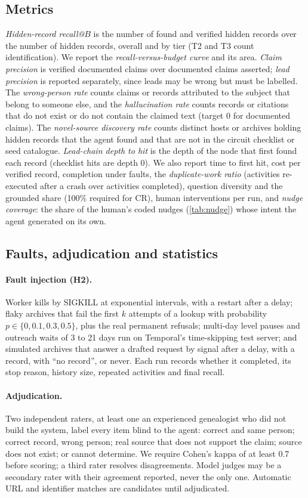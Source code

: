 \subsection{Metrics}
\emph{Hidden-record recall@$B$} is the number of found and verified hidden records over the number of hidden records, overall and by tier (T2 and T3 count identification). We report the \emph{recall-versus-budget curve} and its area. \emph{Claim precision} is verified documented claims over documented claims asserted; \emph{lead precision} is reported separately, since leads may be wrong but must be labelled. The \emph{wrong-person rate} counts claims or records attributed to the subject that belong to someone else, and the \emph{hallucination rate} counts records or citations that do not exist or do not contain the claimed text (target 0 for documented claims). The \emph{novel-source discovery rate} counts distinct hosts or archives holding hidden records that the agent found and that are not in the circuit checklist or seed catalogue. \emph{Lead-chain depth to hit} is the depth of the node that first found each record (checklist hits are depth 0). We also report time to first hit, cost per verified record, completion under faults, the \emph{duplicate-work ratio} (activities re-executed after a crash over activities completed), question diversity and the grounded share (100\% required for CR), human interventions per run, and \emph{nudge coverage}: the share of the human's coded nudges (\cref{tab:nudge}) whose intent the agent generated on its own.

\subsection{Faults, adjudication and statistics}
\paragraph{Fault injection (H2).} Worker kills by SIGKILL at exponential intervals, with a restart after a delay; flaky archives that fail the first $k$ attempts of a lookup with probability $p\in\{0,0.1,0.3,0.5\}$, plus the real permanent refusals; multi-day level pauses and outreach waits of 3 to 21 days run on Temporal's time-skipping test server; and simulated archives that answer a drafted request by signal after a delay, with a record, with ``no record'', or never. Each run records whether it completed, its stop reason, history size, repeated activities and final recall.

\paragraph{Adjudication.} Two independent raters, at least one an experienced genealogist who did not build the system, label every item blind to the agent: correct and same person; correct record, wrong person; real source that does not support the claim; source does not exist; or cannot determine. We require Cohen's kappa \citep{cohen1960kappa} of at least 0.7 before scoring; a third rater resolves disagreements. Model judges may be a secondary rater with their agreement reported, never the only one. Automatic URL and identifier matches are candidates until adjudicated.

